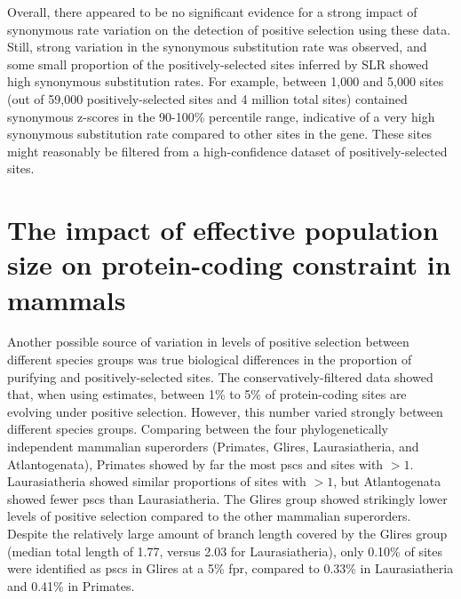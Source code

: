 Overall, there appeared to be no significant evidence for a strong
impact of synonymous rate variation on the detection of positive
selection using these data. Still, strong variation in the synonymous
substitution rate was observed, and some small proportion of the
positively-selected sites inferred by SLR showed high synonymous
substitution rates. For example, between 1,000 and 5,000 sites (out of
59,000 positively-selected sites and 4 million total sites) contained
synonymous z-scores in the 90-100\% percentile range, indicative of a
very high synonymous substitution rate compared to other sites in the
gene. These sites might reasonably be filtered from a high-confidence
dataset of positively-selected sites. 


\section{The impact of effective population size on protein-coding constraint in mammals}

Another possible source of variation in levels of positive selection
between different species groups was true biological differences in
the proportion of purifying and positively-selected sites. The
conservatively-filtered \sw data showed that, when using \omgml
estimates, between 1\% to 5\% of protein-coding sites are evolving
under positive selection. However, this number varied strongly between
different species groups. Comparing between the four phylogenetically
independent mammalian superorders (Primates, Glires, Laurasiatheria,
and Atlantogenata), Primates showed by far the most \acp{psc} and
sites with \omgml$>1$. Laurasiatheria showed similar proportions of
sites with \omgml$>1$, but Atlantogenata showed fewer \acp{psc} than
Laurasiatheria. The Glires group showed strikingly lower levels of
positive selection compared to the other mammalian
superorders. Despite the relatively large amount of branch length
covered by the Glires group (median total length of 1.77, versus 2.03
for Laurasiatheria), only 0.10\% of sites were identified as \acp{psc}
in Glires at a 5\% \ac{fpr}, compared to 0.33\% in Laurasiatheria and
0.41\% in Primates.

